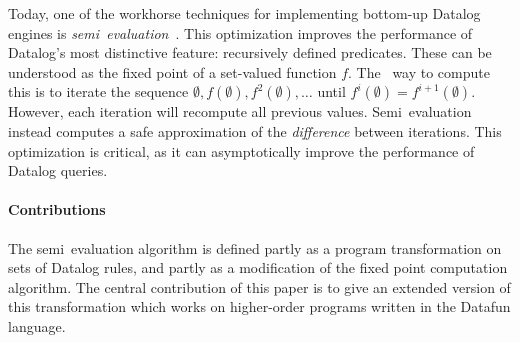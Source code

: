 Today, one of the workhorse techniques for implementing bottom-up
Datalog engines is \emph{semi\naive\ evaluation}~\cite{seminaive}.
This optimization improves the performance of Datalog's most
distinctive feature: recursively defined predicates. These can be
understood as the fixed point of a set-valued function $f$. The
\naive\ way to compute this is to iterate the sequence $\emptyset,
f(\emptyset), f^2(\emptyset), \dots$ until $f^i(\emptyset) =
f^{i+1}(\emptyset)$. However, each iteration will recompute all
previous values. Semi\naive\ evaluation instead computes a safe
approximation of the \emph{difference} between iterations. This
optimization is critical, as it can asymptotically improve the
performance of Datalog queries.

\paragraph{Contributions} The semi\naive\ evaluation algorithm is
defined partly as a program transformation on sets of Datalog rules,
and partly as a modification of the fixed point computation algorithm.
The central contribution of this paper is to give an extended version
of this transformation which works on higher-order programs written
in the Datafun language.

